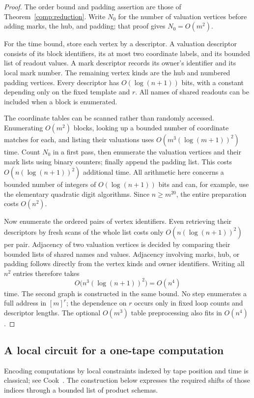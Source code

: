 \begin{proof}
The order bound and padding assertion are those of
Theorem~\ref{comp:reduction}. Write $N_0$ for the number of valuation
vertices before adding marks, the hub, and padding; that proof gives
$N_0=O(m^2)$.

For the time bound, store each vertex by a descriptor. A valuation
descriptor consists of its block identifiers, its at most two coordinate
labels, and its bounded list of readout values. A mark descriptor records
its owner's identifier and its local mark number. The remaining vertex
kinds are the hub and numbered padding vertices. Every descriptor has
$O(\log(n+1))$ bits, with a constant depending only on the fixed template
and $r$.
All names of shared readouts can be included when a block is enumerated.

The coordinate tables can be scanned rather than randomly accessed.
Enumerating $O(m^2)$ blocks, looking up a bounded number of coordinate
matches for each, and listing their valuations uses
$O(m^3(\log(m+1))^2)$ time. Count $N_0$ in a first pass, then enumerate
the valuation vertices and their mark lists using binary counters; finally
append the padding list. This costs
$O(n(\log(n+1))^2)$ additional time. All arithmetic here concerns a bounded
number of integers of $O(\log(n+1))$ bits and can, for example, use the
elementary quadratic digit algorithms. Since $n\geq m^{20}$, the entire
preparation costs $O(n^2)$.

Now enumerate the ordered pairs of vertex identifiers. Even retrieving
their descriptors by fresh scans of the whole list costs only
$O(n(\log(n+1))^2)$ per pair. Adjacency of two valuation vertices is decided
by comparing their bounded lists of shared names and values. Adjacency
involving marks, hub, or padding follows directly from the vertex kinds and
owner identifiers. Writing all $n^2$ entries therefore takes
\[
 O\bigl(n^3(\log(n+1))^2\bigr)=O(n^4)
\]
time. The second graph is constructed in the same bound. No step enumerates
a full address in $[m]^r$; the dependence on $r$ occurs only in fixed loop
counts and descriptor lengths. The optional $O(m^3)$ table preprocessing
also fits in $O(n^4)$.
\end{proof}

\subsection{A local circuit for a one-tape computation}

Encoding computations by local constraints indexed by tape position and
time is classical; see Cook~\cite[proof of Theorem~1]{Cook1971}. The
construction below expresses the required shifts of those indices through
a bounded list of product schemas.

